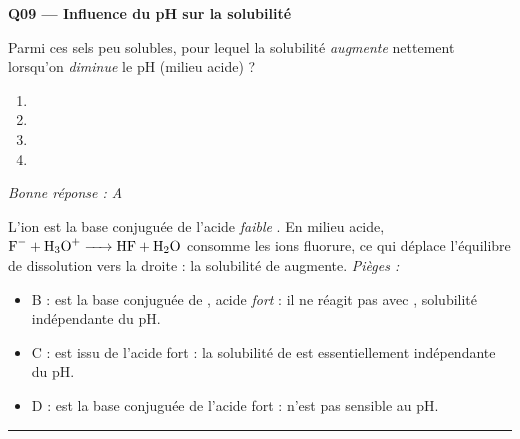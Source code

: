 \documentclass[11pt,a4paper]{article}
\begin{document}
\noindent\textbf{Q09 --- Influence du pH sur la solubilité}\par
Parmi ces sels peu solubles, pour lequel la solubilité \emph{augmente} nettement lorsqu'on \emph{diminue}
le pH (milieu acide) ?
\begin{enumerate}[label=\Alph*)]
\item {}
\item {}
\item {}
\item {}
\end{enumerate}
\textit{Bonne réponse : A}\par
L'ion  est la base conjuguée de l'acide \emph{faible} . En milieu acide, $\ce{F- + H3O+ -> HF + H2O}$
consomme les ions fluorure, ce qui déplace l'équilibre de dissolution vers la droite : la solubilité de  augmente.
\textit{Pièges :}
\begin{itemize}
\item B :  est la base conjuguée de , acide \emph{fort} : il ne réagit pas avec , solubilité indépendante du pH.
\item C :  est issu de l'acide fort  : la solubilité de  est essentiellement indépendante du pH.
\item D :  est la base conjuguée de l'acide fort  :  n'est pas sensible au pH.
\end{itemize}
\vspace{6pt}\hrule\vspace{8pt}
\end{document}
